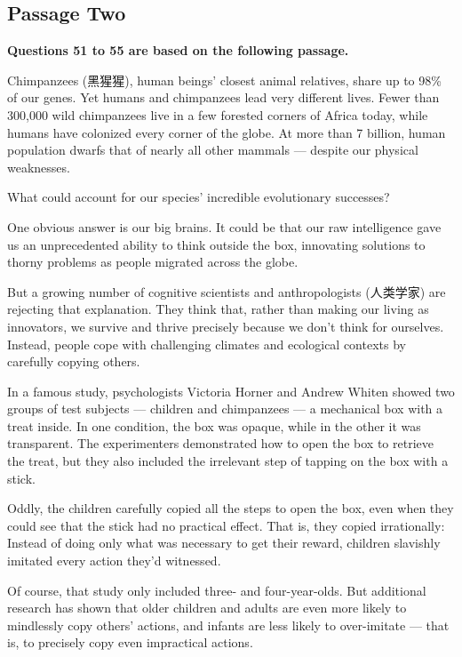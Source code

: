\documentclass[UTF8,11pt]{ctexart}
\begin{document}
\subsection*{\textbf{Passage Two}}


\textbf{Questions 51 to 55 are based on the following passage.}


Chimpanzees (黑猩猩), human beings’ closest animal relatives, share up to 98\% of our genes. Yet humans and chimpanzees lead very different lives. Fewer than 300,000 wild chimpanzees live in a few forested corners of Africa today, while humans have colonized every corner of the globe. At more than 7 billion, human population dwarfs that of nearly all other mammals — despite our physical weaknesses.


What could account for our species’ incredible evolutionary successes?


One obvious answer is our big brains. It could be that our raw intelligence gave us an unprecedented ability to think outside the box, innovating solutions to thorny problems as people migrated across the globe.


But a growing number of cognitive scientists and anthropologists (人类学家) are rejecting that explanation. They think that, rather than making our living as innovators, we survive and thrive precisely because we don’t think for ourselves. Instead, people cope with challenging climates and ecological contexts by carefully copying others.


In a famous study, psychologists Victoria Horner and Andrew Whiten showed two groups of test subjects — children and chimpanzees — a mechanical box with a treat inside. In one condition, the box was opaque, while in the other it was transparent. The experimenters demonstrated how to open the box to retrieve the treat, but they also included the irrelevant step of tapping on the box with a stick.


Oddly, the children carefully copied all the steps to open the box, even when they could see that the stick had no practical effect. That is, they copied irrationally: Instead of doing only what was necessary to get their reward, children slavishly imitated every action they’d witnessed.


Of course, that study only included three- and four-year-olds. But additional research has shown that older children and adults are even more likely to mindlessly copy others’ actions, and infants are less likely to over-imitate — that is, to precisely copy even impractical actions.
\end{document}
